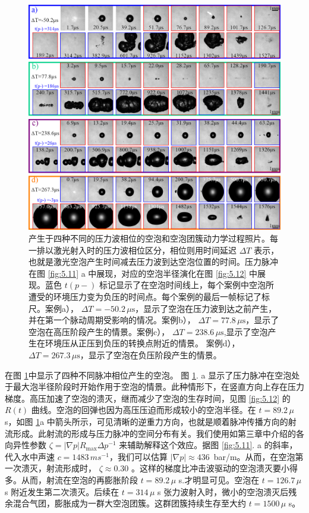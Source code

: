 \begin{figure}[H]
  \centering
  \includegraphics[width=1\linewidth]{img/fig5.13.png}
  \caption[产生于四种不同的压力波相位的空泡和空泡团簇动力学过程照片]{产生于四种不同的压力波相位的空泡和空泡团簇动力学过程照片。每一排以激光射入时的压力波相位区分，相位则用时间延迟
$\Delta T$
表示，也就是激光空泡产生时间减去压力波到达空泡位置的时间。压力脉冲在图
\ref{fig:5.11} a 中展现，对应的空泡半径演化在图 \ref{fig:5.12} 中展现。蓝色 $t (p-)$
标记显示了在空泡时间线上，每个案例中空泡所遭受的环境压力变为负压的时间点。每个案例的最后一帧标记了标尺。案例a），
$\Delta T=-50.2\,\mu \mathrm{s}$，显示了空泡在压力波到达之前产生，并在第一个脉动周期受影响的情况。案例b），
$\Delta T=77.8\,\mu \mathrm{s}$，显示了空泡在高压阶段产生的情景。案例c），
$\Delta T=238.6\,\mu \mathrm{s}$,显示了空泡产生在环境压从正压到负压的转换点附近的情景。
案例d），
$\Delta T=267.3\,\mu \mathrm{s}$，显示了空泡在负压阶段产生的情景。}
  \label{fig:5.13}
\end{figure}

在图 \ref{fig:5.13}中显示了四种不同脉冲相位产生的空泡。 图 \ref{fig:5.13}. a
显示了压力脉冲在空泡处于最大泡半径阶段时开始作用于空泡的情景。此种情形下，在竖直方向上存在压力梯度。高压加速了空泡的溃灭，继而减少了空泡的生存时间，见图
\ref{fig:5.12} 的 $R(t)$ 曲线。空泡的回弹也因为高压压迫而形成较小的空泡半径。在
$t=89.2\,\mu$ s，如图 \ref{fig:5.13}a
中箭头所示，可见清晰的逆重力方向，也就是顺着脉冲传播方向的射流形成。此射流的形成与压力脉冲的空间分布有关。我们使用如第三章中介绍的各向异性参数
${\zeta}=\left|\nabla p\right| R_{\text{max}} \Delta p^{-1}$
来辅助解释这个效应。据图 \ref{fig:5.11}. a 的斜率，代入水中声速
$c=1483\,ms^{-1}$，我们可以估算
$\left| \nabla p\right| \approx 436\,$
bar/m。从而，在空泡第一次溃灭，射流形成时， ${\zeta} \approx 0.30$
。这样的梯度比冲击波驱动的空泡溃灭要小得多\cite{sankin_shock_2005}。从而，射流在空泡的再膨胀阶段
$t=89.2\,\mu$ s.才明显可见。空泡在 $t=126.7\,\mu$ s
附近发生第二次溃灭。后续在 $t=314\,\mu$ s
张力波射入时，微小的空泡溃灭后残余混合气团，膨胀成为一群大空泡团簇。这群团簇持续生存至大约
$t=1500\,\mu$ s。

